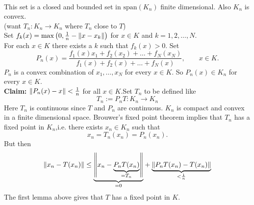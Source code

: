\begin{description}
\begin{beweis}
\begin{align*}
		\end{align*}
		This set is a closed and bounded set in $\text{span}(K_n)$ finite dimensional. Also $K_n$ is convex.  \\
		(want $T_n: K_n \to K_n$ where $T_n$ close to $T$) \\
		Set $f_k(x)= \max \left(0, \frac{1}{n}- \norm{x-x_k}\right)$ for $x \in K$ and $k=1,2, \dots,N$. \\
		For each $x \in K$ there exists a $k$ such that $f_k(x)>0$. Set
		\[
			P_n(x) = \frac{f_1(x)x_1+f_2(x_2)+ \dots+ f_N(x_N)}{f_1(x)+f_2(x)+ \dots+ f_N(x)}, \qquad x \in K.
		\]
		$P_n$ is a convex combination of $x_1,\dots,x_N$ for every $x \in K$. So $P_n(x) \in K_n$ for every $x \in K$. \\
		\textbf{Claim:} \text{    }     $\norm{P_n(x)-x} < \frac{1}{n}$ for all $x \in K$.Set $T_n$ to be defined like
		\[
			T_n := P_n T : K_n \to K_n
		\]
		Here $T_n$ is continuous since $T$ and $P_n$ are continuous. $K_n$ is compact and convex in a finite dimensional space. Brouwer's fixed point theorem implies that $T_n$ has a fixed point in $K_n$,i.e. there exists $x_n \in K_n$ such that
		\[
			x_n = T_n(x_n)= P_n(x_n).
		\]
		But then
		\[
			\norm{x_n - T(x_n)} \leq  \underset{=0}{\underbrace{\norm{x_n - \underset{=T_n}{\underbrace{P_nT(x_n)}}}}} + \underset{< \frac{1}{n}}{\underbrace{\norm{ P_nT(x_n)- T(x_n)}}}
		\]
		The first lemma above gives that $T$ has a fixed point in $K$.
	\end{beweis} 
\end{description}